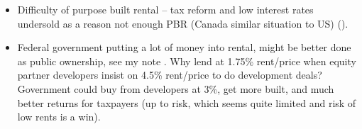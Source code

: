\documentclass[12pt]{article}
\begin{document}
\begin{itemize}
\begin{itemize}
		\end{itemize}
	\item Difficulty of purpose built rental -- tax reform and low interest rates undersold as a reason not enough PBR (Canada similar situation to US) (\textcite{Poterba92}).
	\item Federal government putting a lot of money into rental, might be better done as public ownership, see my note \textcite{Davidoffcmhc}. Why lend at 1.75\% rent/price when equity partner developers insist on 4.5\% rent/price to do development deals? Government could buy from developers at 3\%, get more built, and much better returns for taxpayers (up to risk, which seems quite limited and risk of low rents is a win).
\end{itemize}

\printbibliography
\end{document}
